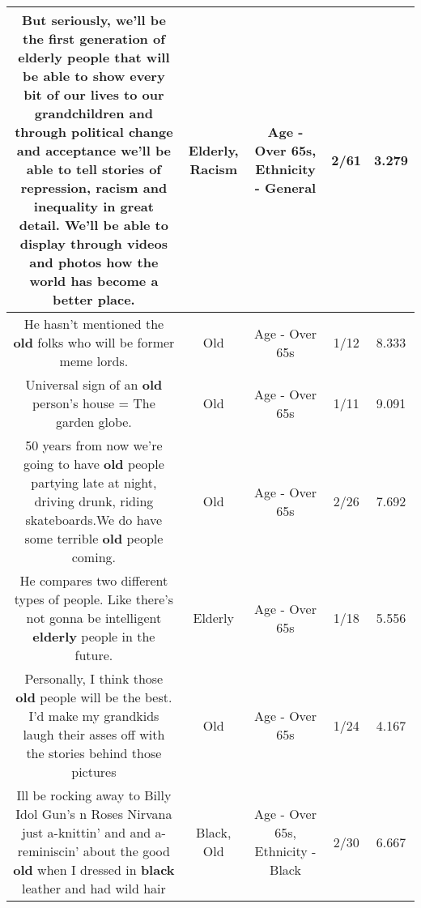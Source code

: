 \documentclass[11pt]{article}
\newlength\mylength
\begin{document}
\begin{center}
\begin{longtable}{|C{.65\mylength}|C{.30\mylength}|C{.12\mylength}|C{.12\mylength}|C{.12\mylength}|}
  \small But seriously, we'll be the first generation of \textbf{elderly} people that will be able to show every bit of our lives to our grandchildren and through political change and acceptance we'll be able to tell stories of repression, \textbf{racism} and inequality in great detail. We'll be able to display through videos and photos how the world has become a better place.\normalsize   & Elderly, Racism & Age - Over 65s, Ethnicity - General & 2/61 & 3.279 \\  \hline
  \small He hasn't mentioned the \textbf{old} folks who will be former meme lords.\normalsize   & Old & Age - Over 65s & 1/12 & 8.333 \\  \hline
  \small Universal sign of an \textbf{old} person's house = The garden globe.\normalsize   & Old & Age - Over 65s & 1/11 & 9.091 \\  \hline
  \small 50 years from now we're going to have \textbf{old} people partying late at night, driving drunk, riding skateboards.We do have some terrible \textbf{old} people coming.\normalsize   & Old & Age - Over 65s & 2/26 & 7.692 \\  \hline
  \small He compares two different types of people. Like there's not gonna be intelligent \textbf{elderly} people in the future.\normalsize   & Elderly & Age - Over 65s & 1/18 & 5.556 \\  \hline
  \small Personally, I think those \textbf{old} people will be the best. I'd make my grandkids laugh their asses off with the stories behind those pictures\normalsize   & Old & Age - Over 65s & 1/24 & 4.167 \\  \hline
  \small Ill be rocking away to Billy Idol Gun's n Roses Nirvana    just a-knittin' and and a-reminiscin' about the good \textbf{old} when I dressed in \textbf{black} leather and had wild hair\normalsize   & Black, Old & Age - Over 65s, Ethnicity - Black & 2/30 & 6.667 \\  \hline

\end{longtable}
\end{center}
\end{document}
